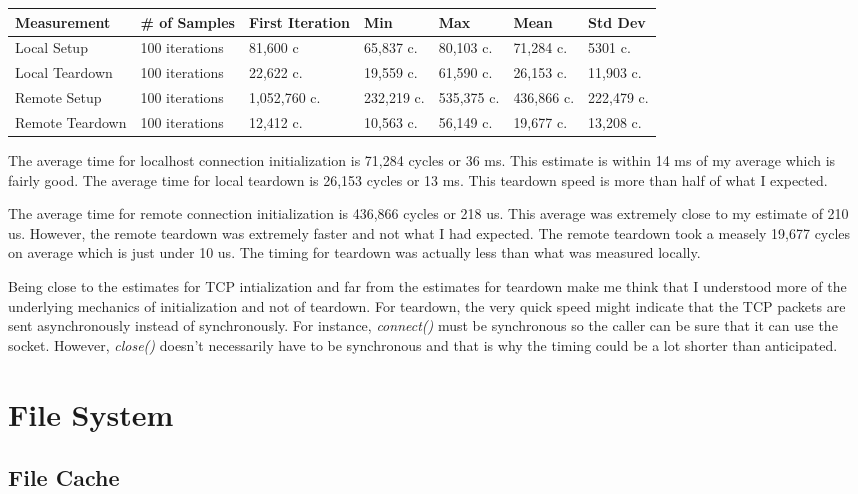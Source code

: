 \documentclass[paper=a4, fontsize=11pt]{scrartcl}
\numberwithin{equation}{section}        %
\numberwithin{figure}{section}          %
\numberwithin{table}{section}               %
\begin{document}
\begin{center}
    \begin{tabular}{ | l | l | l | l | l | l | l |}
    \hline
    Measurement & \# of Samples & First Iteration & Min & Max & Mean & Std Dev \\
    \hline
    Local Setup & 100 iterations & 81,600 c & 65,837 c. & 80,103 c. & 71,284 c. & 5301 c. \\ 
    Local Teardown & 100 iterations & 22,622 c. & 19,559 c. & 61,590 c. & 26,153 c. & 11,903 c. \\
    Remote Setup & 100 iterations & 1,052,760 c. & 232,219 c. & 535,375 c. & 436,866 c. & 222,479 c. \\ 
    Remote Teardown & 100 iterations & 12,412 c. & 10,563 c. & 56,149 c. & 19,677 c. & 13,208 c. \\
    \hline
    \end{tabular}
\end{center}

The average time for localhost connection initialization is 71,284 cycles or 36 ms.  This estimate is within 14 ms of my average which is fairly good.  The average time for local teardown is 26,153 cycles or 13 ms.  This teardown speed is more than half of what I expected. 

The average time for remote connection initialization is 436,866 cycles or 218 us.  This average was extremely close to my estimate of 210 us.  However, the remote teardown was extremely faster and not what I had expected.  The remote teardown took a measely 19,677 cycles on average which is just under 10 us.  The timing for teardown was actually less than what was measured locally.

Being close to the estimates for TCP intialization and far from the estimates for teardown make me think that I understood more of the underlying mechanics of initialization and not of teardown.  For teardown, the very quick speed might indicate that the TCP packets are sent asynchronously instead of synchronously.  For instance, \textit{connect()} must be synchronous so the caller can be sure that it can use the socket.  However, \textit{close()} doesn't necessarily have to be synchronous and that is why the timing could be a lot shorter than anticipated.

\section{File System}

\subsection{File Cache}
\end{document}
